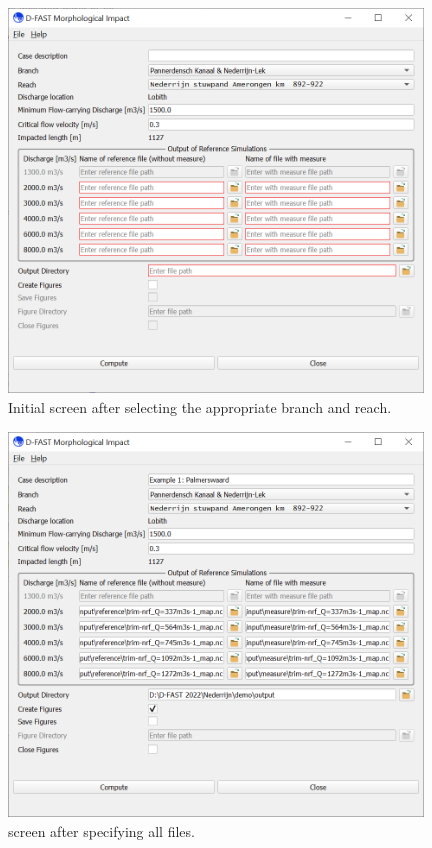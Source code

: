 \begin{figure}
\center
\includegraphics[width=11cm]{figures/Palmerswaard_empty.png}
\caption{Initial \dfmi screen after selecting the appropriate branch and reach.}
\label{Palmers_empty}
\end{figure}

\begin{figure}
\center
\includegraphics[width=11cm]{figures/Palmerswaard_config.png}
\caption{\dfmi screen after specifying all files.}
\label{Palmers_config}
\end{figure}


